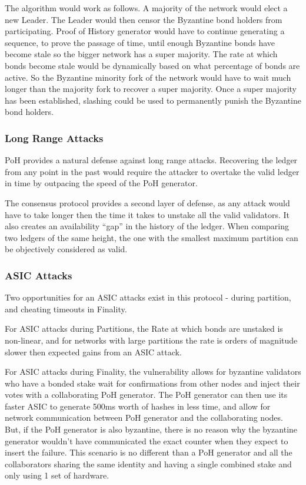 \documentclass[12pt]{ltjsarticle}
\begin{document}
The algorithm would work as follows. A majority of the network would elect a new Leader. The Leader would then censor the Byzantine bond holders from participating. Proof of History generator would have to continue generating a sequence, to prove the passage of time, until enough Byzantine bonds have become stale so the bigger network has a super majority. The rate at which bonds become stale would be dynamically based on what percentage of bonds are active. So the Byzantine minority fork of the network would have to wait much longer than the majority fork to recover a super majority. Once a super majority has been established, slashing could be used to permanently punish the Byzantine bond holders.

\subsubsection{Long Range Attacks}\label{censorship}
PoH provides a natural defense against long range attacks. Recovering the ledger from any point in the past would require the attacker to overtake the valid ledger in time by outpacing the speed of the PoH generator.

The consensus protocol provides a second layer of defense, as any attack would have to take longer then the time it takes to unstake all the valid validators. It also creates an availability “gap” in the history of the ledger. When comparing two ledgers of the same height, the one with the smallest maximum partition can be objectively considered as valid.

\subsubsection{ASIC Attacks}\label{censorship}

Two opportunities for an ASIC attacks exist in this protocol - during partition, and cheating timeouts in Finality.

For ASIC attacks during Partitions, the Rate at which bonds are unstaked is non-linear, and for networks with large partitions the rate is orders of magnitude slower then expected gains from an ASIC attack.

For ASIC attacks during Finality, the vulnerability allows for byzantine validators who have a bonded stake wait for confirmations from other nodes and inject their votes with a collaborating PoH generator. The PoH generator can then use its faster ASIC to generate 500ms worth of hashes in less time, and allow for network communication between PoH generator and the collaborating nodes. But, if the PoH generator is also byzantine, there is no reason why the byzantine generator wouldn’t have communicated the exact counter when they expect to insert the failure. This scenario is no different than a PoH generator and all the collaborators sharing the same identity and having a single combined stake and only using 1 set of hardware.
\end{document}
